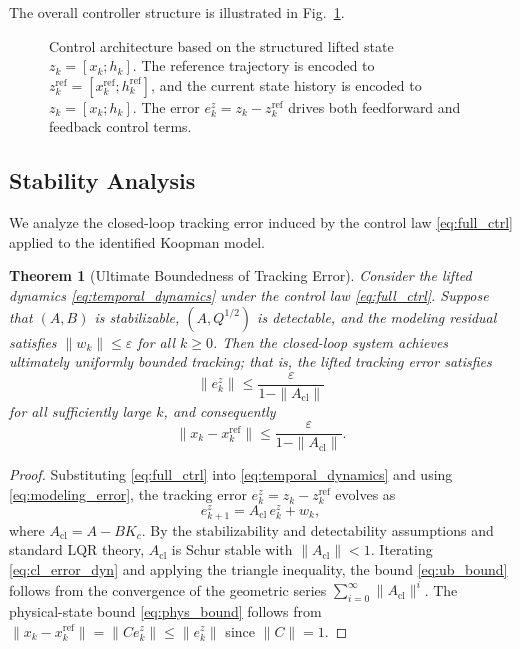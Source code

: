 \documentclass[journal]{IEEEtran}
\newtheorem{theorem}{Theorem}
\begin{document}
The overall controller structure is illustrated in Fig.~\ref{fig:control_architecture}.

\begin{figure}[!t]
    \centering
    \caption{Control architecture based on the structured lifted state $z_k=[x_k;h_k]$. The reference trajectory is encoded to $z_k^{\mathrm{ref}}=[x_k^{\mathrm{ref}};h_k^{\mathrm{ref}}]$, and the current state history is encoded to $z_k=[x_k;h_k]$. The error $e_k^z = z_k - z_k^{\mathrm{ref}}$ drives both feedforward and feedback control terms.}
    \label{fig:control_architecture}
\end{figure}

\subsection{Stability Analysis}
\label{subsec:stability}

We analyze the closed-loop tracking error induced by the control law \eqref{eq:full_ctrl} applied to the identified Koopman model.

\begin{theorem}[Ultimate Boundedness of Tracking Error]
\label{thm:ub}
Consider the lifted dynamics \eqref{eq:temporal_dynamics} under the control law \eqref{eq:full_ctrl}. Suppose that $(A, B)$ is stabilizable, $(A, Q^{1/2})$ is detectable, and the modeling residual satisfies $\|w_k\| \leq \varepsilon$ for all $k \geq 0$. Then the closed-loop system achieves ultimately uniformly bounded tracking; that is, the lifted tracking error satisfies
\begin{equation}
    \|e_k^z\| \leq \frac{\varepsilon}{1 - \|A_{\mathrm{cl}}\|}
    \label{eq:ub_bound}
\end{equation}
for all sufficiently large $k$, and consequently
\begin{equation}
    \|x_k - x_k^{\mathrm{ref}}\| \leq \frac{\varepsilon}{1 - \|A_{\mathrm{cl}}\|}.
    \label{eq:phys_bound}
\end{equation}
\end{theorem}

\begin{proof}
Substituting \eqref{eq:full_ctrl} into \eqref{eq:temporal_dynamics} and using \eqref{eq:modeling_error}, the tracking error $e_k^z = z_k - z_k^{\mathrm{ref}}$ evolves as
\begin{equation}
    e_{k+1}^z = A_{\mathrm{cl}}\, e_k^z + w_k,
    \label{eq:cl_error_dyn}
\end{equation}
where $A_{\mathrm{cl}} = A - BK_c$. By the stabilizability and detectability assumptions and standard LQR theory, $A_{\mathrm{cl}}$ is Schur stable with $\|A_{\mathrm{cl}}\| < 1$. Iterating \eqref{eq:cl_error_dyn} and applying the triangle inequality, the bound \eqref{eq:ub_bound} follows from the convergence of the geometric series $\sum_{i=0}^{\infty}\|A_{\mathrm{cl}}\|^i$. The physical-state bound \eqref{eq:phys_bound} follows from $\|x_k - x_k^{\mathrm{ref}}\| = \|Ce_k^z\| \leq \|e_k^z\|$ since $\|C\| = 1$.
\end{proof}
\end{document}
